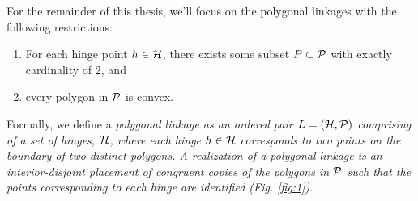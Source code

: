 For the remainder of this thesis, we'll focus on the polygonal linkages with the following 
restrictions:
\begin{enumerate}
 \item  For each hinge point $h \in {\cal H}$, there exists some subset $P \subset {\cal P}$ with 
exactly cardinality of 2, and
\item every polygon in ${\cal P}$ is convex.
\end{enumerate}
Formally, we define a \it{polygonal linkage} as an ordered pair $L = ({\cal H},{\cal P})$ comprising of a 
set of hinges, ${\cal H}$, where each hinge $h\in {\cal H}$ corresponds to two points on the boundary of two 
distinct polygons. A \emph{realization} of a polygonal linkage is an interior-disjoint placement of 
congruent copies of the polygons in ${\cal P}$ such that the points corresponding to each hinge are 
identified (Fig. \ref{fig:1}). 
